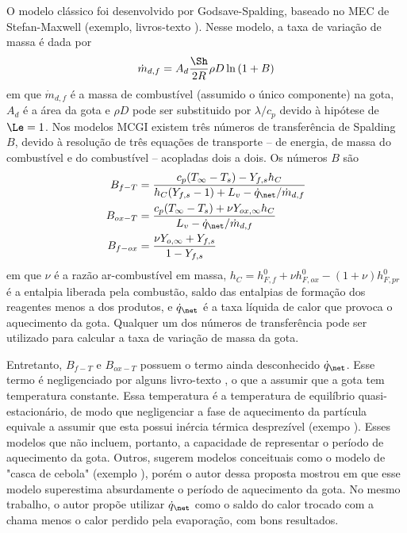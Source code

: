 O modelo clássico foi desenvolvido por Godsave-Spalding, baseado no MEC de Stefan-Maxwell (exemplo, livros-texto \cite{Glassman2008,Law2006,Turns2000}).
Nesse modelo, a taxa de variação de massa é dada por
\begin{equation}
    \dot m_{d,f} = A_d \frac{\Sh}{2R} \rho D \ln{(1 + B)} \label{eq:m_evap_B_M_2}
\end{equation}
em que $\dot m_{d,f}$ é a massa de combustível (assumido o único componente) na gota, $A_d$ é a área da gota e $\rho D$ pode ser substituido por $\lambda/c_p$ devido à hipótese de $\Le=1$.
Nos modelos MCGI existem três números de transferência de Spalding $B$, devido à resolução de três equações de transporte -- de energia, de massa do combustível e do combustível -- acopladas dois a dois.
Os números $B$ são
\begin{align}
    B_{f-T}  &= \frac{c_p(T_\infty - T_s) - Y_{f,s} h_C}{h_C(Y_{f,s} - 1) + L_v - \dot q_{\net}/\dot m_{d,f}} \label{eq:B_fq}\\
    B_{ox-T} &= \frac{c_p(T_\infty - T_s) + \nu Y_{ox,\infty}h_C}{L_v  - \dot q_{\net}/\dot m_{d,f}} \label{eq:B_oq}\\
    B_{f-ox} &= \frac{\nu Y_{o,\infty} + Y_{f,s}}{1 - Y_{f,s}} \label{eq:B_fo}
\end{align}
em que $\nu$ é a razão ar-combustível em massa, $h_C=h^0_{F,f} + \nu h^0_{F,ox} - (1+\nu)h^0_{F,pr}$ é a entalpia liberada pela combustão, saldo das entalpias de formação dos reagentes menos a dos produtos, e $\dot q_\net$ é a taxa líquida de calor que provoca o aquecimento da gota.
Qualquer um dos números de transferência pode ser utilizado para calcular a taxa de variação de massa da gota.

Entretanto, $B_{f-T}$ e $B_{ox-T}$ possuem o termo ainda desconhecido $\dot q_\net$.
Esse termo é negligenciado por alguns livro-texto \cite{Glassman2008,Williams1985}, o que a assumir que a gota tem temperatura constante. 
Essa temperatura é a temperatura de equilíbrio quasi-estacionário, de modo que negligenciar a fase de aquecimento da partícula equivale a assumir que esta possui inércia térmica desprezível (exempo \cite{Turns2000,Glassman2008}). 
Esses modelos que não incluem, portanto, a capacidade de representar o  período de aquecimento da gota.
Outros, sugerem modelos conceituais como o modelo de "casca de cebola" (exemplo \cite[p. 385]{Turns2000}), porém o autor dessa proposta mostrou em \cite{HenningsJ2024MT} que esse modelo superestima absurdamente o período de aquecimento da gota.
No mesmo trabalho, o autor propõe utilizar $\dot q_\net$ como o saldo do calor trocado com a chama menos o calor perdido pela evaporação, com bons resultados.

